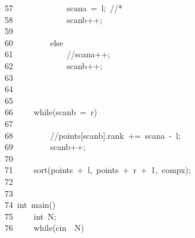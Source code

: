 \documentclass{article}
\newcommand{\hlstd}[1]{\textcolor[rgb]{0.2,0.2,0.2}{#1}}
\newcommand{\hlnum}[1]{\textcolor[rgb]{0.06,0.58,0.63}{#1}}
\newcommand{\hlslc}[1]{\textcolor[rgb]{0.59,0.59,0.59}{#1}}
\newcommand{\hlopt}[1]{\textcolor[rgb]{0.2,0.2,0.2}{#1}}
\newcommand{\hllin}[1]{\textcolor[rgb]{0.59,0.59,0.59}{#1}}
\newcommand{\hlkwa}[1]{\textcolor[rgb]{0.23,0.42,0.78}{#1}}
\newcommand{\hlkwb}[1]{\textcolor[rgb]{0.63,0,0.31}{#1}}
\newcommand{\hlkwd}[1]{\textcolor[rgb]{0.78,0.23,0.41}{#1}}
\begin{document}
	\hllin{57\ }\hlstd{}\hlstd{\ \ \ \ \ \ \ \ \ \ \ \ }\hlstd{scan\textunderscore a\ }\hlopt{=\ }\hlstd{l}\hlopt{;\ }\hlstd{}\hlslc{//{*}}\\
	\hllin{58\ }\hlstd{}\hlstd{\ \ \ \ \ \ \ \ \ \ \ \ }\hlstd{scan\textunderscore b}\hlopt{++;}\\
	\hllin{59\ }\hlstd{}\\
	\hllin{60\ }\hlstd{}\hlstd{\ \ \ \ \ \ \ \ }\hlstd{}\hlopt{\usebox{\hlboxclosebrace}}\hlstd{}\hlkwa{else}\hlstd{}\hlopt{\usebox{\hlboxopenbrace}}\\
	\hllin{61\ }\hlstd{}\hlstd{\ \ \ \ \ \ \ \ \ \ \ \ }\hlstd{}\hlslc{//scan\textunderscore a++;}\\
	\hllin{62\ }\hlstd{}\hlstd{\ \ \ \ \ \ \ \ \ \ \ \ }\hlstd{scan\textunderscore b}\hlopt{++;}\\
	\hllin{63\ }\hlstd{}\hlstd{\ \ \ \ \ \ \ \ }\hlstd{}\hlopt{\usebox{\hlboxclosebrace}}\\
	\hllin{64\ }\hlstd{}\\
	\hllin{65\ }\hlstd{}\hlstd{\ \ \ \ }\hlstd{}\hlopt{\usebox{\hlboxclosebrace}}\\
	\hllin{66\ }\hlstd{}\hlstd{\ \ \ \ }\hlstd{}\hlkwa{while}\hlstd{}\hlopt{(}\hlstd{scan\textunderscore b\ }\hlopt{\usebox{\hlboxlessthan}=\ }\hlstd{r}\hlopt{)\ \usebox{\hlboxopenbrace}}\\
	\hllin{67\ }\hlstd{}\\
	\hllin{68\ }\hlstd{}\hlstd{\ \ \ \ \ \ \ \ }\hlstd{}\hlslc{//points{[}scan\textunderscore b{]}.rank\ +=\ scan\textunderscore a\ {-}\ l;}\\
	\hllin{69\ }\hlstd{}\hlstd{\ \ \ \ \ \ \ \ }\hlstd{scan\textunderscore b}\hlopt{++;}\\
	\hllin{70\ }\hlstd{}\hlstd{\ \ \ \ }\hlstd{}\hlopt{\usebox{\hlboxclosebrace}}\\
	\hllin{71\ }\hlstd{}\hlstd{\ \ \ \ }\hlstd{}\hlkwd{sort}\hlstd{}\hlopt{(}\hlstd{points\ }\hlopt{+\ }\hlstd{l}\hlopt{,\ }\hlstd{points\ }\hlopt{+\ }\hlstd{r\ }\hlopt{+\ }\hlstd{}\hlnum{1}\hlstd{}\hlopt{,\ }\hlstd{comp\textunderscore x}\hlopt{);}\\
	\hllin{72\ }\hlstd{}\hlopt{\usebox{\hlboxclosebrace}}\\
	\hllin{73\ }\hlstd{}\\
	\hllin{74\ }\hlstd{}\hlkwb{int\ }\hlstd{}\hlkwd{main}\hlstd{}\hlopt{()\ \usebox{\hlboxopenbrace}}\\
	\hllin{75\ }\hlstd{}\hlstd{\ \ \ \ }\hlstd{}\hlkwb{int\ }\hlstd{N}\hlopt{;}\\
	\hllin{76\ }\hlstd{}\hlstd{\ \ \ \ }\hlstd{}\hlkwa{while}\hlstd{}\hlopt{(}\hlstd{cin\ }\hlopt{\usebox{\hlboxgreaterthan}\usebox{\hlboxgreaterthan}\ }\hlstd{N}\hlopt{)\usebox{\hlboxopenbrace}}\\
\end{document}
